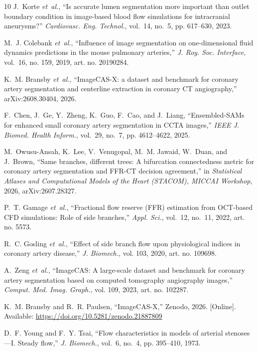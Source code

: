 \documentclass[journal,twoside,web]{ieeecolor}
\begin{document}
\begin{thebibliography}{10}
J.~Korte \emph{et~al.}, ``Is accurate lumen segmentation more important than
  outlet boundary condition in image-based blood flow simulations for
  intracranial aneurysms?'' \emph{Cardiovasc. Eng. Technol.}, vol.~14, no.~5,
  pp. 617--630, 2023.

M.~J. Colebank \emph{et~al.}, ``Influence of image segmentation on
  one-dimensional fluid dynamics predictions in the mouse pulmonary arteries,''
  \emph{J. Roy. Soc. Interface}, vol.~16, no. 159, 2019, art. no. 20190284.

K.~M. Bransby \emph{et~al.}, ``{ImageCAS-X}: a dataset and benchmark for
  coronary artery segmentation and centerline extraction in coronary {CT}
  angiography,'' arXiv:2608.30404, 2026.

F.~Chen, J.~Ge, Y.~Zheng, K.~Guo, F.~Cao, and J.~Liang, ``Ensembled-{SAMs} for
  enhanced small coronary artery segmentation in {CCTA} images,'' \emph{IEEE J.
  Biomed. Health Inform.}, vol.~29, no.~7, pp. 4612--4622, 2025.

M.~Owusu-Ansah, K.~Lee, V.~Venugopal, M.~M. Jawaid, W.~Duan, and J.~Brown,
  ``Same branches, different trees: {A} bifurcation connectedness metric for
  coronary artery segmentation and {FFR-CT} decision agreement,'' in
  \emph{Statistical Atlases and Computational Models of the Heart ({STACOM}),
  {MICCAI} Workshop}, 2026, arXiv:2607.28327.

P.~T. Gamage \emph{et~al.}, ``Fractional flow reserve ({FFR}) estimation from
  {OCT}-based {CFD} simulations: {R}ole of side branches,'' \emph{Appl. Sci.},
  vol.~12, no.~11, 2022, art. no. 5573.

R.~C. Gosling \emph{et~al.}, ``Effect of side branch flow upon physiological
  indices in coronary artery disease,'' \emph{J. Biomech.}, vol. 103, 2020,
  art. no. 109698.

A.~Zeng \emph{et~al.}, ``{ImageCAS}: {A} large-scale dataset and benchmark for
  coronary artery segmentation based on computed tomography angiography
  images,'' \emph{Comput. Med. Imag. Graph.}, vol. 109, 2023, art. no. 102287.

\BIBentryALTinterwordspacing
K.~M. Bransby and R.~R. Paulsen, ``{ImageCAS-X},'' Zenodo, 2026. [Online].
  Available: \url{https://doi.org/10.5281/zenodo.21887809}
\BIBentrySTDinterwordspacing

D.~F. Young and F.~Y. Tsai, ``Flow characteristics in models of arterial
  stenoses---{I}. {S}teady flow,'' \emph{J. Biomech.}, vol.~6, no.~4, pp.
  395--410, 1973.


\end{thebibliography}
\end{document}
